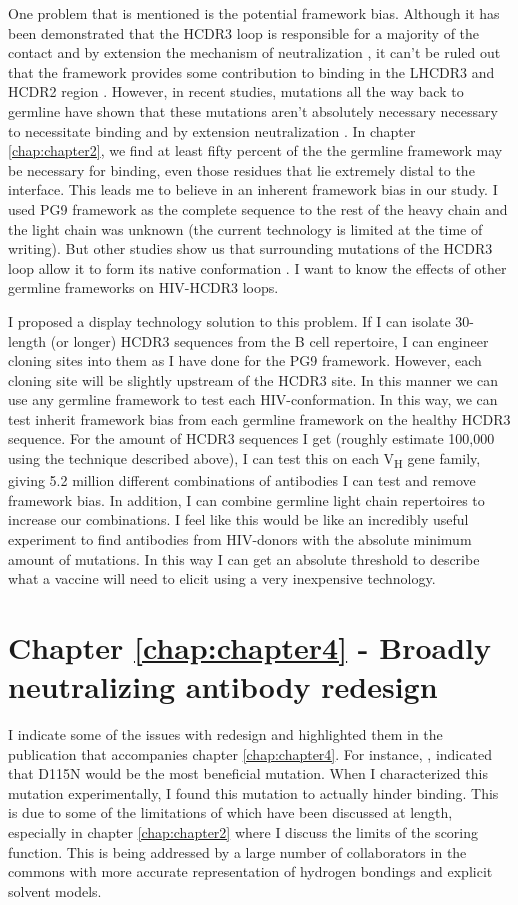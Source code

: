 One problem that is mentioned is the potential framework bias. Although it has been demonstrated that the HCDR3 loop is responsible for a majority of the contact and by extension the mechanism of neutralization \citep{Pejchal:2010fp,Pancera:2010hh}, it can't be ruled out that the framework provides some contribution to binding in the LHCDR3 and HCDR2 region \citep{McLellan:2011dg}. However, in recent studies, mutations all the way back to germline have shown that these mutations aren't absolutely necessary necessary to necessitate binding and by extension neutralization \citep{Klein:2013iz}. In chapter \ref{chap:chapter2}, we find at least fifty percent of the the germline framework may be necessary for binding, even those residues that lie extremely distal to the interface. This leads me to believe in an inherent framework bias in our study. I used PG9 framework as the complete sequence to the rest of the heavy chain and the light chain was unknown (the current technology is limited at the time of writing). But other studies show us that surrounding mutations of the HCDR3 loop allow it to form its native conformation \citep{Wong:2011ff}. I want to know the effects of other germline frameworks on HIV-\naive HCDR3 loops.

I proposed a display technology solution to this problem. If I can isolate 30-length (or longer) HCDR3 sequences from the B cell repertoire, I can engineer cloning sites into them as I have done for the PG9 framework. However, each cloning site will be slightly upstream of the HCDR3 site. In this manner we can use any germline framework to test each HIV-\naive conformation. In this way, we can test inherit framework bias from each germline framework on the healthy HCDR3 sequence. For the amount of HCDR3 sequences I get (roughly estimate 100,000 using the technique described above), I can test this on each V\textsubscript{H} gene family, giving 5.2 million different combinations of antibodies I can test and remove framework bias. In addition, I can combine germline light chain repertoires to increase our combinations. I feel like this would be like an incredibly useful experiment to find antibodies from HIV-\naive donors with the absolute minimum amount of mutations. In this way I can get an absolute threshold to describe what a vaccine will need to elicit using a very inexpensive technology.

\section{Chapter \ref{chap:chapter4} - Broadly neutralizing antibody redesign}
I indicate some of the issues with redesign and highlighted them in the publication that accompanies chapter \ref{chap:chapter4}. For instance, \rosettadesign, indicated that D115N would be the most beneficial mutation. When I characterized this mutation experimentally, I found this mutation to actually hinder binding. This is due to some of the limitations of \rosetta which have been discussed at length, especially in chapter \ref{chap:chapter2} where I discuss the limits of the \rosetta scoring function. This is being addressed by a large number of \rosetta collaborators in the commons with more accurate representation of hydrogen bondings and explicit solvent models.

